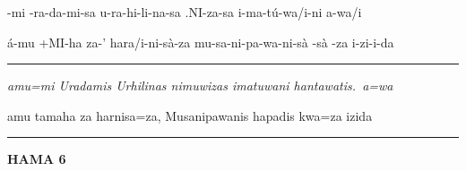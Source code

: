\setcounter{parcount}{0}
\begin{parnumbersa}[]
	\raggedright%
	\itshape%

	-mi
	-ra-da-mi-sa
	u-ra-hi-li-na-sa
	.NI-za-sa
	i-ma-tú-wa/i-ni
	a-wa/i

	á-mu +MI-ha za-' hara/i-ni-sà-za
	mu-sa-ni-pa-wa-ni-sà
	-sà
	-za i-zi-i-da



\end{parnumbersa}

\vspace{10pt}
\hrule
\vspace{10pt}

\setcounter{parcount}{0}
\begin{parnumbersa}[]
	\raggedright%
	\itshape%
	amu=mi Uradamis Urhilinas nimuwizas imatuwani hantawatis.\ a=wa

	amu tamaha za harnisa=za, Musanipawanis hapadis kwa=za izida

\end{parnumbersa}

\vspace{10pt}
\hrule
\vspace{20pt}

\sloppybottom%
\clearpage

\noindent \textbf{HAMA 6}
\vspace{10pt}

\setcounter{parcount}{0}
\begin{parnumbersa}[]
	\raggedright%
	\itshape%

	\large {}\hspace{5pt}
	\hspace{5pt}
	\hspace{5pt}
	\hspace{5pt}
	\hspace{5pt}
	\hspace{5pt}
	\hspace{5pt}

	\large {}\hspace{5pt}
	\hspace{5pt}
	\hspace{5pt}
	\hspace{5pt}
	\hspace{5pt}
	\hspace{5pt}


\end{parnumbersa}

